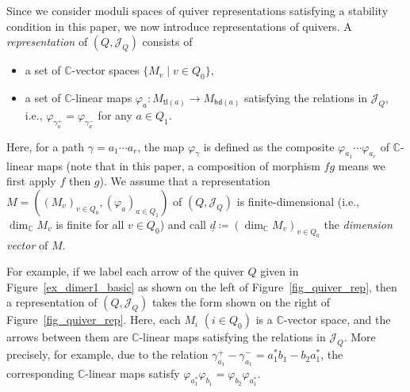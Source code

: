 \documentclass[pdftex]{sigma}
\numberwithin{equation}{section}
\theoremstyle{definition}
\newcommand{\CC}{\mathbb{C}}
\newcommand{\calJ}{\mathcal{J}}
\newcommand{\hd}{\mathsf{hd}}
\newcommand{\tl}{\mathsf{tl}}
\newcommand{\dd}{\underline{d}}
\begin{document}
Since we consider moduli spaces of quiver representations satisfying a stability condition in this paper,
we now introduce representations of quivers.
A \emph{representation} of $(Q,\calJ_Q)$ consists of
\begin{itemize}\itemsep=0pt
\item a set of $\CC$-vector spaces $\{M_v \mid v\in Q_0\}$,
\item a set of $\CC$-linear maps $\varphi_a\colon M_{\tl(a)}\rightarrow M_{\hd(a)}$ satisfying the relations in $\calJ_Q$,
i.e., $\varphi_{\gamma_a^+}=\varphi_{\gamma_a^-}$ for any $a\in Q_1$.
\end{itemize}
\noindent
Here, for a path $\gamma=a_1\cdots a_r$, the map $\varphi_\gamma$ is defined as the composite $\varphi_{a_1}\cdots\varphi_{a_r}$ of $\CC$-linear maps
(note that in this paper, a composition of morphism $fg$ means we first apply $f$ then $g$).
We assume that a representation $M=((M_v)_{v\in Q_0}, (\varphi_a)_{a\in Q_1})$ of $(Q,\calJ_Q)$ is finite-dimensional
(i.e., $\dim_\CC M_v$ is finite for all $v\in Q_0$) and call ${\dd}\coloneqq(\dim_\CC M_v)_{v\in Q_0}$ the \emph{dimension vector} of $M$.

For example, if we label each arrow of the quiver $Q$ given in Figure~\ref{ex_dimer1_basic} as shown on the left of Figure~\ref{fig_quiver_rep},
then a representation of $(Q,\calJ_Q)$ takes the form shown on the right of Figure~\ref{fig_quiver_rep}.
Here, each $M_i$ $(i\in Q_0)$ is a $\CC$-vector space, and the arrows between them are $\CC$-linear maps satisfying the relations in $\calJ_Q$.
More precisely, for example, due to the relation $\gamma_{a_1}^+-\gamma_{a_1}^-=a_1^*b_1-b_2a_1^*$,
the corresponding $\CC$-linear maps satisfy $\varphi_{a_1^*}\varphi_{b_1}=\varphi_{b_2}\varphi_{a_1^*}$.
\end{document}
